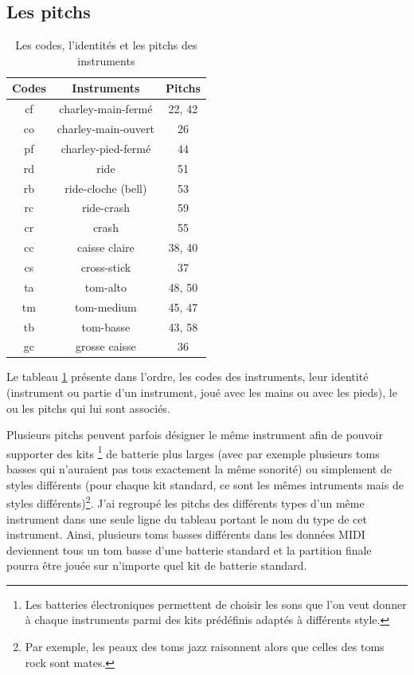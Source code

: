 \subsection*{Les pitchs}
\begin{table}[h]
	\centering
	\begin{tabular}{|c|c|c|} \hline
		Codes & Instruments & Pitchs \\ \hline
		cf & charley-main-fermé & 22, 42 \\
		co & charley-main-ouvert & 26 \\
		pf & charley-pied-fermé & 44 \\
		rd & ride & 51 \\
		rb & ride-cloche (bell) & 53 \\
		rc & ride-crash & 59 \\
		cr & crash & 55 \\
		cc & caisse claire & 38, 40 \\
		cs & cross-stick & 37 \\
		ta & tom-alto & 48, 50 \\
		tm & tom-medium & 45, 47 \\
		tb & tom-basse & 43, 58 \\
		gc & grosse caisse & 36 \\ \hline
	\end{tabular}
	\caption{Les codes, l’identités et les pitchs des instruments}
	\label{pitchs_instru}
\end{table}
Le tableau \ref{pitchs_instru} présente dans l’ordre, les codes des
instruments, leur identité (instrument ou partie d’un instrument, joué avec les
mains ou avec les pieds), le ou les pitchs qui lui sont associés.

Plusieurs pitchs peuvent parfois désigner le même instrument afin de pouvoir
supporter des kits \footnote{Les batteries électroniques permettent de choisir
les sons que l’on veut donner à chaque instruments parmi des kits prédéfinis
adaptés à différents style.} de batterie plus larges (avec par exemple plusieurs
toms basses qui n’auraient pas tous exactement la même sonorité) ou simplement
de styles différents (pour chaque kit standard, ce sont les mêmes intruments
mais de styles différents)\footnote{Par exemple, les peaux des toms jazz
raisonnent alors que celles des toms rock sont mates.}. J’ai regroupé les pitchs des
différents types d’un même instrument dans une seule ligne du tableau portant
le nom du type de cet instrument. Ainsi,
plusieurs toms basses différents dans les données MIDI deviennent tous un tom
basse d’une batterie standard et la partition finale pourra être jouée sur
n’importe quel kit de batterie standard.

